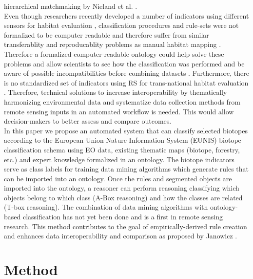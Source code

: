 \documentclass[authoryear, review,12pt,number]{elsarticle}
\begin{document}
hierarchical matchmaking by Nieland et al. \citep{Nieland2015}. 
\\
Even though researchers recently developed a number of indicators using
different sensors for habitat evaluation \citep{Nagendra2013}, classification
procedures and rule-sets were not formalized to be computer readable and
therefore suffer from similar transferablity and reproducablity problems as
manual habitat mapping \citep{Arvor2013, Nieland2015}.
Therefore a formalized computer-readable ontology could help solve these
problems and allow scientists to see how the classification was performed and 
be aware of possible incompatibilities before combining datasets
\citep{Janowicz2012}. 
Furthermore, there is no standardized set of indicators
using RS for trans-national habitat evaluation \citep{Lucas2015}. Therefore,
technical solutions to increase interoperability by thematically harmonizing
environmental data and systematize data collection methods from remote sensing
inputs in an automated workflow is needed. This would allow decision-makers 
to better assess and compare outcomes.
\\
In this paper we propose an automated system that can
classify selected biotopes according to the European Union Nature Information
System (EUNIS) biotope classification schema using EO data, existing
thematic maps (biotope, forestry, etc.) and expert knowledge formalized in an
ontology. The biotope indicators serve as class labels for training data mining
algorithms which generate rules that can be imported into an ontology. Once the
rules and segmented objects are imported into the ontology, a reasoner can
perform reasoning classifying which objects belong to which class (A-Box 
reasoning) and how the classes are related (T-box reasoning). The combination 
of data mining algorithms with ontology-based classification has not yet been 
done and is a first in remote sensing research. This method contributes to the 
goal of empirically-derived rule creation and enhances data interoperability and 
comparison as proposed by Janowicz \citep{Janowicz2012}.
\section{Method}
\end{document}
